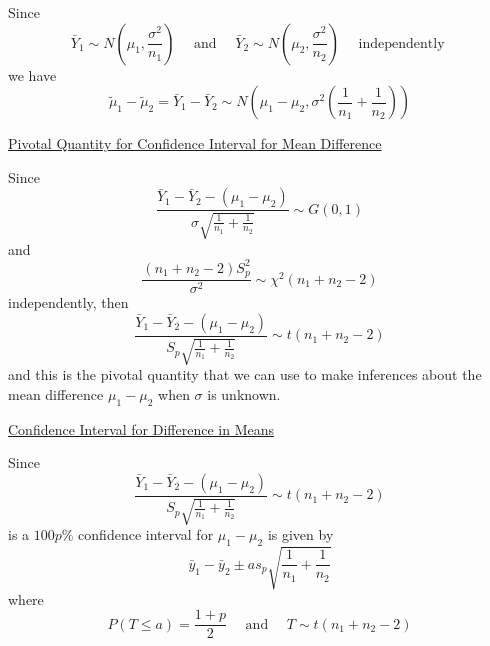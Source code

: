 Since
\[\bar{Y}_{1} \sim N\left(\mu_{1}, \frac{\sigma^{2}}{n_{1}}\right) \quad \text { and } \quad \bar{Y}_{2} \sim N\left(\mu_{2}, \frac{\sigma^{2}}{n_{2}}\right) \quad \text { independently }\]
we have
\[\tilde{\mu}_{1}-\tilde{\mu}_{2}=\bar{Y}_{1}-\bar{Y}_{2}
    \sim N\left(\mu_{1}-\mu_{2}, \sigma^{2}\left(\frac{1}{n_{1}}+\frac{1}{n_{2}}\right)\right)\]

\underline{Pivotal Quantity for Confidence Interval for Mean Difference}

Since
\[\frac{\bar{Y}_{1}-\bar{Y}_{2}-\left(\mu_{1}-\mu_{2}\right)}{\sigma \sqrt{\frac{1}{n_{1}}+\frac{1}{n_{2}}}} \sim G(0,1)\]
and
\[\frac{\left(n_{1}+n_{2}-2\right) S_{p}^{2}}{\sigma^{2}} \sim \chi^{2}\left(n_{1}+n_{2}-2\right)\]
independently, then
\[\frac{\bar{Y}_{1}-\bar{Y}_{2}-\left(\mu_{1}-\mu_{2}\right)}{S_{p} \sqrt{\frac{1}{n_{1}}+\frac{1}{n_{2}}}} \sim t\left(n_{1}+n_{2}-2\right)\]
and this is the pivotal quantity that we can use to make inferences about the mean difference
$ \mu_1-\mu_2 $ when $ \sigma $ is unknown.

\underline{Confidence Interval for Difference in Means}

Since
\[\frac{\bar{Y}_{1}-\bar{Y}_{2}-\left(\mu_{1}-\mu_{2}\right)}{S_{p} \sqrt{\frac{1}{n_{1}}+\frac{1}{n_{2}}}} \sim t\left(n_{1}+n_{2}-2\right)\]
is a $ 100p\% $ confidence interval for $ \mu_1-\mu_2 $ is given by
\[\bar{y}_{1}-\bar{y}_{2} \pm a s_{p} \sqrt{\frac{1}{n_{1}}+\frac{1}{n_{2}}}\]
where
\[P(T \leq a)=\frac{1+p}{2} \quad \text { and } \quad T \sim t\left(n_{1}+n_{2}-2\right)\]

